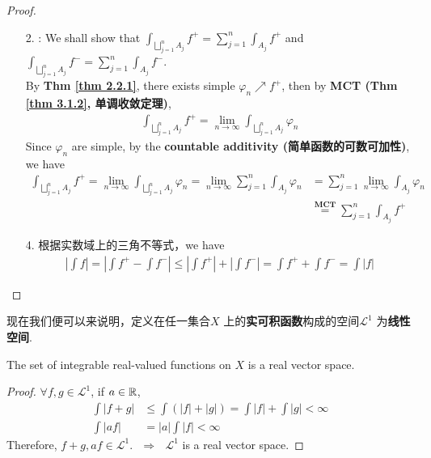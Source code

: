 \begin{proposition}
 		\vspace{2em}
 		\begin{proof}
 			\begin{enumerate}
 				\item[2.]: We shall show that $\int_{\bigsqcup_{j = 1}^{n}{A_j}}{f^{+}} = \sum_{j = 1}^{n}{\int_{A_j}{f^{+}}}$ and $\int_{\bigsqcup_{j = 1}^{n}{A_j}}{f^{-}} = \sum_{j = 1}^{n}{\int_{A_j}{f^{-}}}$.\\
 				By \textbf{Thm \ref{thm 2.2.1}}, there exists simple $\varphi_n \nearrow f^{+}$, then by \textbf{MCT (Thm \ref{thm 3.1.2}, 单调收敛定理)},
 				\begin{align}
 					\int_{\bigsqcup_{j = 1}^{n}{A_j}}{f^{+}} = \lim_{n \to \infty}{\int_{\bigsqcup_{j = 1}^{n}{A_j}}{\varphi_n}}
 				\end{align}
 				Since $\varphi_n$ are simple, by the \textbf{countable additivity (简单函数的可数可加性)}, we have
 				\begin{align}
 					\int_{\bigsqcup_{j = 1}^{n}{A_j}}{f^{+}} 
 					= \lim_{n \to \infty}{\int_{\bigsqcup_{j = 1}^{n}{A_j}}{\varphi_n}}
 					= \lim_{n \to \infty}{\sum_{j = 1}^{n}{\int_{A_j}{\varphi_n}}}
 					&= \sum_{j = 1}^{n}{\lim_{n \to \infty}{\int_{A_j}{\varphi_n}}} \\
 					&\overset{\textbf{MCT}}{=} \sum_{j = 1}^{n}{\int_{A_j}{f^{+}}}
 				\end{align}
 			
 				\vspace{2em}
 				
 				\item[4.] 根据实数域上的三角不等式，we have
 				\begin{align}
 					\left| \int{f} \right| 
 					= \left| \int{f^{+}} - \int{f^{-}} \right| 
 					\leq \left| \int{f^{+}} \right| + \left| \int{f^{-}} \right|
 					= \int{f^{+}} + \int{f^{-}}
 					= \int{\left| f \right|}
 				\end{align}
 			\end{enumerate}
 		\end{proof}
 	\end{proposition}
 
 \newpage
 	现在我们便可以来说明，定义在任一集合$X$ 上的\textbf{实可积函数}构成的空间$\mathcal{L}^1$ 为\textbf{线性空间}. 
 	\begin{proposition}\label{prop 3.1.5}
 		The set of integrable real-valued functions on $X$ is a real vector space.
 		
 		\vspace{2em}
 		\begin{proof}
 			$\forall f , g \in \mathcal{L}^1$, if $a \in \mathbb{R}$,
 			\begin{align}
 				\int{\left| f + g \right|} 
 				&\leq \int{(\left| f \right| + \left| g \right|)}
 				= \int{\left| f \right|} + \int{\left| g \right|}
 				< \infty \\
 				\int{\left| af \right|} 
 				&= \left| a \right| \int{\left| f \right|} 
 				< \infty
 			\end{align}
 			Therefore, $f + g , af \in \mathcal{L}^1$. $\,\, \Rightarrow \,\,$ $\mathcal{L}^1$ is a real vector space.
 		\end{proof}
 	\end{proposition}
 
